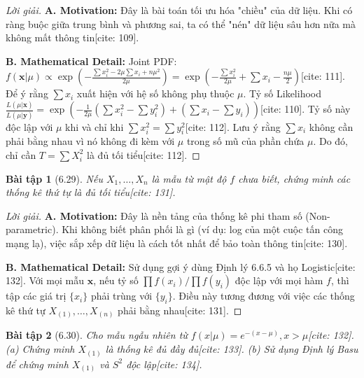 \documentclass[8pt,a4paper]{article}
\newtheorem{exercise}{Bài tập}
\newenvironment{solution}{\begin{proof}[Lời giải]}{\end{proof}}
\begin{document}
\begin{solution}
\textbf{A. Motivation:} Đây là bài toán tối ưu hóa "chiều" của dữ liệu. Khi có ràng buộc giữa trung bình và phương sai, ta có thể "nén" dữ liệu sâu hơn nữa mà không mất thông tin[cite: 109].

\textbf{B. Mathematical Detail:}
Joint PDF: $f(\mathbf{x}|\mu) \propto \exp\left( -\frac{\sum x_i^2 - 2\mu \sum x_i + n\mu^2}{2\mu} \right) = \exp\left( -\frac{\sum x_i^2}{2\mu} + \sum x_i - \frac{n\mu}{2} \right)$[cite: 111].
Để ý rằng $\sum x_i$ xuất hiện với hệ số không phụ thuộc $\mu$. 
Tỷ số Likelihood $\frac{L(\mu|\mathbf{x})}{L(\mu|\mathbf{y})} = \exp\left( -\frac{1}{2\mu}(\sum x_i^2 - \sum y_i^2) + (\sum x_i - \sum y_i) \right)$[cite: 110].
Tỷ số này độc lập với $\mu$ khi và chỉ khi $\sum x_i^2 = \sum y_i^2$[cite: 112]. 
Lưu ý rằng $\sum x_i$ không cần phải bằng nhau vì nó không đi kèm với $\mu$ trong số mũ của phần chứa $\mu$. Do đó, chỉ cần $T = \sum X_i^2$ là đủ tối tiểu[cite: 112].
\end{solution}

\begin{exercise}[6.29]
Nếu $X_1, \dots, X_n$ là mẫu từ mật độ $f$ chưa biết, chứng minh các thống kê thứ tự là đủ tối tiểu[cite: 131].
\end{exercise}

\begin{solution}
\textbf{A. Motivation:} Đây là nền tảng của thống kê phi tham số (Non-parametric). Khi không biết phân phối là gì (ví dụ: log của một cuộc tấn công mạng lạ), việc sắp xếp dữ liệu là cách tốt nhất để bảo toàn thông tin[cite: 130].

\textbf{B. Mathematical Detail:}
Sử dụng gợi ý dùng Định lý 6.6.5 và họ Logistic[cite: 132]. Với mọi mẫu $\mathbf{x}$, nếu tỷ số $\prod f(x_i)/\prod f(y_i)$ độc lập với mọi hàm $f$, thì tập các giá trị $\{x_i\}$ phải trùng với $\{y_i\}$. Điều này tương đương với việc các thống kê thứ tự $X_{(1)}, \dots, X_{(n)}$ phải bằng nhau[cite: 131].
\end{solution}

\begin{exercise}[6.30]
Cho mẫu ngẫu nhiên từ $f(x|\mu) = e^{-(x-\mu)}, x > \mu$[cite: 132].
(a) Chứng minh $X_{(1)}$ là thống kê đủ đầy đủ[cite: 133].
(b) Sử dụng Định lý Basu để chứng minh $X_{(1)}$ và $S^2$ độc lập[cite: 134].
\end{exercise}
\end{document}
